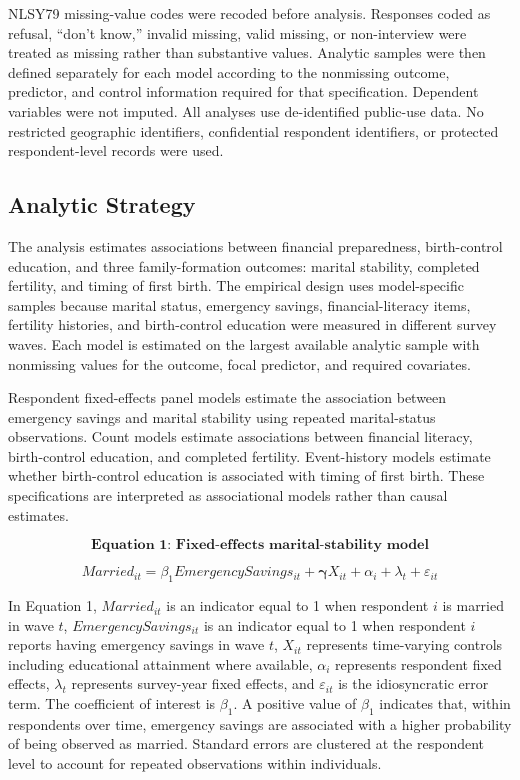 \documentclass[12pt]{article}
\begin{document}
NLSY79 missing-value codes were recoded before analysis. Responses coded as refusal, ``don't know,'' invalid missing, valid missing, or non-interview were treated as missing rather than substantive values. Analytic samples were then defined separately for each model according to the nonmissing outcome, predictor, and control information required for that specification. Dependent variables were not imputed. All analyses use de-identified public-use data. No restricted geographic identifiers, confidential respondent identifiers, or protected respondent-level records were used.

\subsection{Analytic Strategy}

The analysis estimates associations between financial preparedness, birth-control education, and three family-formation outcomes: marital stability, completed fertility, and timing of first birth. The empirical design uses model-specific samples because marital status, emergency savings, financial-literacy items, fertility histories, and birth-control education were measured in different survey waves. Each model is estimated on the largest available analytic sample with nonmissing values for the outcome, focal predictor, and required covariates.

Respondent fixed-effects panel models estimate the association between emergency savings and marital stability using repeated marital-status observations. Count models estimate associations between financial literacy, birth-control education, and completed fertility. Event-history models estimate whether birth-control education is associated with timing of first birth. These specifications are interpreted as associational models rather than causal estimates.

\[
\textbf{Equation 1: Fixed-effects marital-stability model}
\]

\begin{equation}
Married_{it} = \beta_{1}EmergencySavings_{it} + \boldsymbol{\gamma}X_{it} + \alpha_i + \lambda_t + \varepsilon_{it}
\end{equation}

In Equation 1, \(Married_{it}\) is an indicator equal to 1 when respondent \(i\) is married in wave \(t\), \(EmergencySavings_{it}\) is an indicator equal to 1 when respondent \(i\) reports having emergency savings in wave \(t\), \(X_{it}\) represents time-varying controls including educational attainment where available, \(\alpha_i\) represents respondent fixed effects, \(\lambda_t\) represents survey-year fixed effects, and \(\varepsilon_{it}\) is the idiosyncratic error term. The coefficient of interest is \(\beta_{1}\). A positive value of \(\beta_{1}\) indicates that, within respondents over time, emergency savings are associated with a higher probability of being observed as married. Standard errors are clustered at the respondent level to account for repeated observations within individuals.
\end{document}
